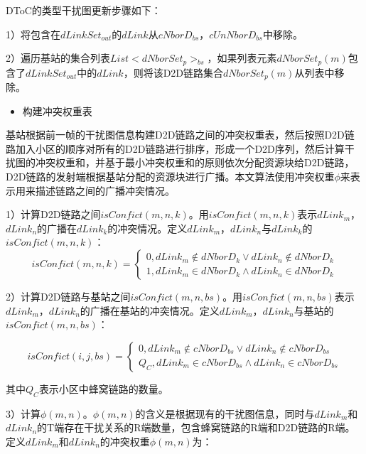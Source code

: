 \documentclass[figurelist,tablelist,algorithmlist,nomlist,masters]{seuthesix}
\begin{document}
	DToC的类型干扰图更新步骤如下：
	
	1）将包含在$dLinkSet_{out}$的$dLink$从$cNborD_{bs}$，$cUnNborD_{bs}$中移除。
	
	2）遍历基站的集合列表$List < dNborSet_{p}{ > _{bs}}$，如果列表元素$dNborSet_{p}(m)$包含了$dLinkSet_{out}$中的$dLink$，则将该D2D链路集合$dNborSet_{p}(m)$从列表中移除。
	
	\begin{itemize}
		\item 构建冲突权重表
	\end{itemize}
	
	基站根据前一帧的干扰图信息构建D2D链路之间的冲突权重表，然后按照D2D链路加入小区的顺序对所有的D2D链路进行排序，形成一个D2D序列，然后计算干扰图的冲突权重和，并基于最小冲突权重和的原则依次分配资源块给D2D链路，D2D链路的发射端根据基站分配的资源块进行广播。本文算法使用冲突权重$\phi $来表示用来描述链路之间的广播冲突情况。
	
	1）计算D2D链路之间$isConfict(m,n,k)$。用$isConfict(m,n,k)$表示$dLink_m$，$dLink_n$的广播在$dLink_k$的冲突情况。定义$dLink_m$，$dLink_n$与$dLink_k$的$isConfict(m,n,k)$：
	\begin{equation}\label{eq2.3}
	isConfict(m,n,k) = \left\{ \begin{array}{l}
	0,dLink_m \notin dNborD_k \lor dLink_n \notin dNborD_k\\
	1,dLink_m \in dNborD_k \land dLink_n \in dNborD_k
	\end{array} \right.
	\end{equation}
	
	2）计算D2D链路与基站之间$isConfict(m,n,bs)$。用$isConfict(m,n,bs)$表示$dLink_m$，$dLink_n$的广播在基站的冲突情况。定义$dLink_m$，$dLink_n$与基站的$isConfict(m,n,bs)$：
	
	\begin{equation}\label{eq2.4}
	isConfict(i,j,bs) = \left\{ \begin{array}{l} 0,dLink_m \notin cNborD_{bs} \lor dLink_n \notin cNborD_{bs}\\Q_C,dLink_m \in cNborD_{bs} \land dLink_n \in cNborD_{bs} \end{array} \right.
	\end{equation}
	
	其中$Q_C$表示小区中蜂窝链路的数量。
	
	3）计算$\phi (m,n)$。$\phi (m,n)$的含义是根据现有的干扰图信息，同时与$dLink_m$和$dLink_n$的T端存在干扰关系的R端数量，包含蜂窝链路的R端和D2D链路的R端。定义$dLink_m$和$dLink_n$的冲突权重$\phi (m,n)$为：
	
\end{document}
